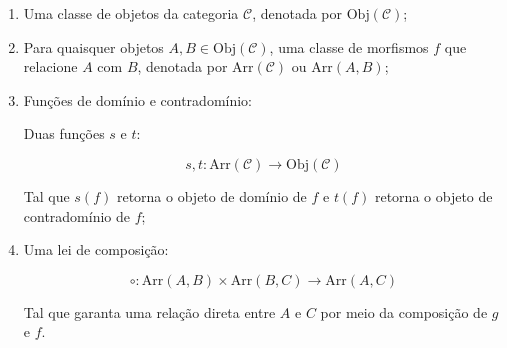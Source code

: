 \documentclass[12pt,a4paper]{article}
\begin{document}
\begin{enumerate}
    \begin{enumerate}
        \begin{enumerate}

            \item Uma classe de objetos da categoria $\mathcal{C}$, denotada por $\mathrm{Obj}(\mathcal{C})$;

            \item Para quaisquer objetos $A, B \in \mathrm{Obj}(\mathcal{C})$, uma classe de morfismos $f$ que relacione $A$ com $B$, denotada por $\mathrm{Arr}(\mathcal{C})$ ou $\mathrm{Arr}(A, B)$;

            \begin{center}
            \end{center}

            \item Funções de domínio e contradomínio:

            Duas funções $s$ e $t$:
            
            \[
                s, t : \text{Arr}(\mathcal{C}) \to \text{Obj}(\mathcal{C})
            \]

            Tal que $s(f)$ retorna o objeto de domínio de $f$ e $t(f)$ retorna o objeto de contradomínio de $f$;
            
            \item Uma lei de composição:

            \[
                \circ : \text{Arr}(A,B) \times \text{Arr}(B,C) \to \text{Arr}(A,C)
            \]

            Tal que garanta uma relação direta entre $A$ e $C$ por meio da composição de $g$ e $f$.

            \begin{center}
            \end{center}

            
        \end{enumerate}
    \end{enumerate}
\end{enumerate}
\end{document}
